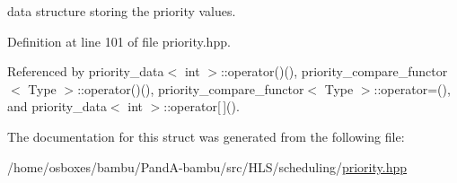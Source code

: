 data structure storing the priority values. 



Definition at line 101 of file priority.\+hpp.



Referenced by priority\+\_\+data$<$ int $>$\+::operator()(), priority\+\_\+compare\+\_\+functor$<$ Type $>$\+::operator()(), priority\+\_\+compare\+\_\+functor$<$ Type $>$\+::operator=(), and priority\+\_\+data$<$ int $>$\+::operator\mbox{[}$\,$\mbox{]}().



The documentation for this struct was generated from the following file\+:\begin{DoxyCompactItemize}
\item 
/home/osboxes/bambu/\+Pand\+A-\/bambu/src/\+H\+L\+S/scheduling/\hyperlink{priority_8hpp}{priority.\+hpp}\end{DoxyCompactItemize}
